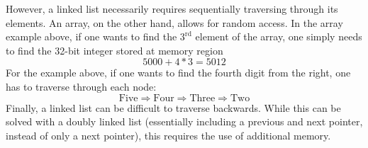 \documentclass[a4paper]{article}
\begin{document}
However, a linked list necessarily requires sequentially traversing through its elements. An array, on the other hand, allows for random access. In the array example above, if one wants to find the $3^{\text{rd}}$ element of the array, one simply needs to find the 32-bit integer stored at memory region \[5000 + 4 * 3 = 5012\] For the example above, if one wants to find the fourth digit from the right, one has to traverse through each node: \[\text{Five} \Rightarrow \text{Four} \Rightarrow \text{Three} \Rightarrow \text{Two}\] Finally, a linked list can be difficult to traverse backwards. While this can be solved with a doubly linked list (essentially including a previous and next pointer, instead of only a next pointer), this requires the use of additional memory.
\end{document}
